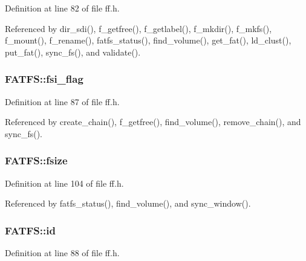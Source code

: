 Definition at line 82 of file ff.\-h.



Referenced by dir\-\_\-sdi(), f\-\_\-getfree(), f\-\_\-getlabel(), f\-\_\-mkdir(), f\-\_\-mkfs(), f\-\_\-mount(), f\-\_\-rename(), fatfs\-\_\-status(), find\-\_\-volume(), get\-\_\-fat(), ld\-\_\-clust(), put\-\_\-fat(), sync\-\_\-fs(), and validate().

\hypertarget{structFATFS_a84e9cdc5a6a8e33ea7ec192058abf161}{
\subsubsection[{fsi\-\_\-flag}]{ F\-A\-T\-F\-S\-::fsi\-\_\-flag}}\label{structFATFS_a84e9cdc5a6a8e33ea7ec192058abf161}


Definition at line 87 of file ff.\-h.



Referenced by create\-\_\-chain(), f\-\_\-getfree(), find\-\_\-volume(), remove\-\_\-chain(), and sync\-\_\-fs().

\hypertarget{structFATFS_a53e9560659f14e66f306c2c444198bf3}{
\subsubsection[{fsize}]{ F\-A\-T\-F\-S\-::fsize}}\label{structFATFS_a53e9560659f14e66f306c2c444198bf3}


Definition at line 104 of file ff.\-h.



Referenced by fatfs\-\_\-status(), find\-\_\-volume(), and sync\-\_\-window().

\hypertarget{structFATFS_a417095d7c20d56d417dc0998e0dd5a5c}{
\subsubsection[{id}]{ F\-A\-T\-F\-S\-::id}}\label{structFATFS_a417095d7c20d56d417dc0998e0dd5a5c}


Definition at line 88 of file ff.\-h.



